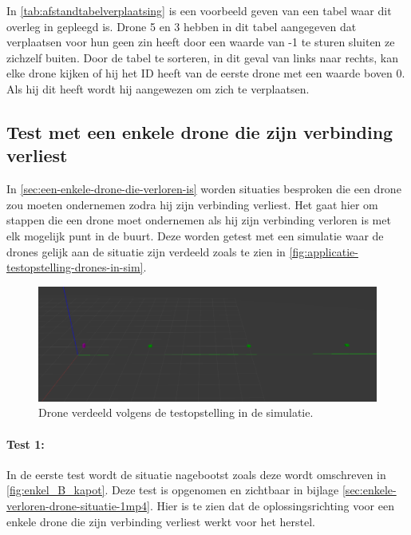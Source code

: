\documentclass[a4paper, 11pt, oneside]{report}
\begin{document}
In \autoref{tab:afstandtabelverplaatsing} is een voorbeeld geven van een tabel waar dit overleg in gepleegd is. 
Drone 5 en 3 hebben in dit tabel aangegeven dat verplaatsen voor hun geen zin heeft door een waarde van -1 te sturen sluiten ze zichzelf buiten.
Door de tabel te sorteren, in dit geval van links naar rechts, kan elke drone kijken of hij het ID heeft van de eerste drone met een waarde boven 0. Als hij dit heeft wordt hij aangewezen om zich te verplaatsen.

\subsection{Test met een enkele drone die zijn verbinding verliest}

In \autoref{sec:een-enkele-drone-die-verloren-is} worden situaties besproken die een drone zou moeten ondernemen zodra hij zijn verbinding verliest. Het gaat hier om stappen die een drone moet ondernemen als hij zijn verbinding verloren is met elk mogelijk punt in de buurt.
Deze worden getest met een simulatie waar de drones gelijk aan de situatie zijn verdeeld zoals te zien in 	\autoref{fig:applicatie-testopstelling-drones-in-sim}.

\begin{figure}[H]
	\begin{center}\includegraphics[width=\linewidth]{Afbeeldingen/droneopstelling_in_sim.png}\end{center}
	\caption{Drone verdeeld volgens de testopstelling in de simulatie.}
	\label{fig:applicatie-testopstelling-drones-in-sim}
\end{figure}
\paragraph{Test 1:} In de eerste test wordt de situatie nagebootst zoals deze wordt omschreven in \autoref{fig:enkel_B_kapot}.
Deze test is opgenomen en zichtbaar in bijlage \ref{sec:enkele-verloren-drone-situatie-1mp4}. 
Hier is te zien dat de oplossingsrichting voor een enkele drone die zijn verbinding verliest werkt voor het herstel.
\end{document}
